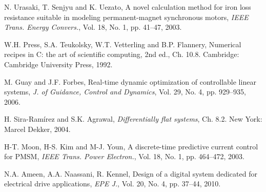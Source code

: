 \documentclass[a4paper,11pt,fleqn]{article}
\begin{document}
\begin{thebibliography}{99}
N. Urasaki, T. Senjyu and K. Uezato, A novel calculation method for iron loss resistance suitable in modeling permanent-magnet synchronous motors, {\it IEEE Trans. Energy Convers.}, Vol. 18, No. 1, pp. 41--47, 2003.

W.H. Press, S.A. Teukolsky, W.T. Vetterling and B.P. Flannery, {Numerical recipes in C: the art of scientific computing}, 2nd ed., Ch. 10.8. Cambridge: Cambridge University Press, 1992.

M. Guay and J.F. Forbes, Real-time dynamic optimization of controllable linear systems, {\it J. of Guidance, Control and Dynamics}, Vol. 29, No. 4, pp. 929--935, 2006.

H. Sira-Ram\'irez and S.K. Agrawal, {\it Differentially flat systems}, Ch. 8.2. New York: Marcel Dekker, 2004.

H-T. Moon, H-S. Kim and M-J. Youn, A discrete-time predictive current control for PMSM, {\it IEEE Trans. Power Electron.}, Vol. 18, No. 1, pp. 464--472, 2003.


N.A. Ameen, A.A. Naassani, R. Kennel, Design of a digital system dedicated for electrical drive applications, {\it EPE J.}, Vol. 20, No. 4, pp. 37--44, 2010.







\end{thebibliography}
\end{document}
